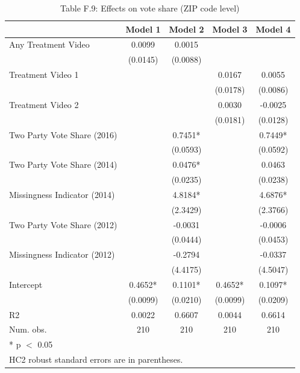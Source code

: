\begin{table}
\centering
\caption{Table F.9: Effects on vote share (ZIP code level)}
\centering
\begin{tabular}[t]{lcccc}
\toprule
  & Model 1 & Model 2 & Model 3 & Model 4\\
\midrule
Any Treatment Video & 0.0099 & 0.0015 &  & \\
 & (0.0145) & (0.0088) &  & \\
Treatment Video 1 &  &  & 0.0167 & 0.0055\\
 &  &  & (0.0178) & (0.0086)\\
Treatment Video 2 &  &  & 0.0030 & -0.0025\\
 &  &  & (0.0181) & (0.0128)\\
Two Party Vote Share (2016) &  & 0.7451* &  & 0.7449*\\
 &  & (0.0593) &  & (0.0592)\\
Two Party Vote Share (2014) &  & 0.0476* &  & 0.0463\\
 &  & (0.0235) &  & (0.0238)\\
Missingness Indicator (2014) &  & 4.8184* &  & 4.6876*\\
 &  & (2.3429) &  & (2.3766)\\
Two Party Vote Share (2012) &  & -0.0031 &  & -0.0006\\
 &  & (0.0444) &  & (0.0453)\\
Missingness Indicator (2012) &  & -0.2794 &  & -0.0337\\
 &  & (4.4175) &  & (4.5047)\\
Intercept & 0.4652* & 0.1101* & 0.4652* & 0.1097*\\
 & (0.0099) & (0.0210) & (0.0099) & (0.0209)\\
\midrule
R2 & 0.0022 & 0.6607 & 0.0044 & 0.6614\\
Num. obs. & 210 & 210 & 210 & 210\\
\bottomrule
\multicolumn{5}{l}{\rule{0pt}{1em}* p $<$ 0.05}\\
\multicolumn{5}{l}{\rule{0pt}{1em}HC2 robust standard errors are in parentheses.}\\
\end{tabular}
\end{table}
